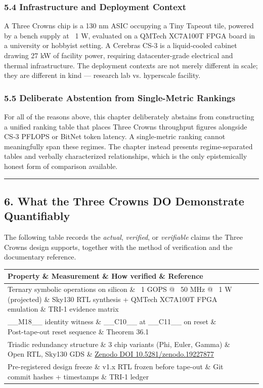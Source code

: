 \subsubsection{5.4 Infrastructure and Deployment Context}

A Three Crowns chip is a 130 nm ASIC occupying a Tiny Tapeout tile, powered by a bench supply at ~1 W, evaluated on a QMTech XC7A100T FPGA board in a university or hobbyist setting. A Cerebras CS-3 is a liquid-cooled cabinet drawing 27 kW of facility power, requiring datacenter-grade electrical and thermal infrastructure. The deployment contexts are not merely different in scale; they are different in kind --- research lab vs. hyperscale facility.

\subsubsection{5.5 Deliberate Abstention from Single-Metric Rankings}

For all of the reasons above, this chapter deliberately abstains from constructing a unified ranking table that places Three Crowns throughput figures alongside CS-3 PFLOPS or BitNet token latency. A single-metric ranking cannot meaningfully span these regimes. The chapter instead presents regime-separated tables and verbally characterized relationships, which is the only epistemically honest form of comparison available.

\noindent\rule{\textwidth}{0.4pt}

\subsection{6. What the Three Crowns DO Demonstrate Quantifiably}

The following table records the \textit{actual}, \textit{verified}, or \textit{verifiable} claims the Three Crowns design supports, together with the method of verification and the documentary reference.

\begin{tabular}{|l|l|l|l|}
\hline
Property \& Measurement \& How verified \& Reference \\
\hline
Ternary symbolic operations on silicon \& ~1 GOPS @ ~50 MHz @ ~1 W (projected) \& Sky130 RTL synthesis + QMTech XC7A100T FPGA emulation \& TRI-1 evidence matrix \\
\_\_M18\_\_ identity witness \& \_\_C10\_\_ at \_\_C11\_\_ on reset \& Post-tape-out reset sequence \& Theorem 36.1 \\
Triadic redundancy structure \& 3 chip variants (Phi, Euler, Gamma) \& Open RTL, Sky130 GDS \& \href{https://doi.org/10.5281/zenodo.19227877}{Zenodo DOI 10.5281/zenodo.19227877} \\
Pre-registered design freeze \& v1.x RTL frozen before tape-out \& Git commit hashes + timestamps \& TRI-1 ledger \\
\hline
\end{tabular}
